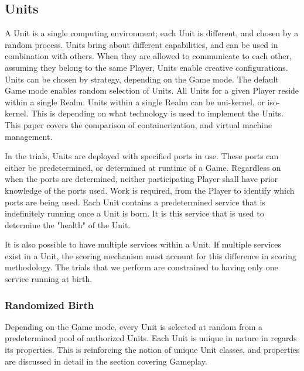 \documentclass[10pt, titlepage, twocolumn]{article}
\newcommand{\ii}{\indent\indent}
\begin{document}
\subsection{Units}
\ii
A Unit is a single computing environment; each Unit is different, and chosen by a random process. Units bring about different capabilities, and can be used in combination with others. When they are allowed to communicate to each other, assuming they belong to the same Player, Units enable creative configurations. Units can be chosen by strategy, depending on the Game mode. The default Game mode enables random selection of Units. All Units for a given Player reside within a single Realm. Units within a single Realm can be uni-kernel, or iso-kernel. This is depending on what technology is used to implement the Units. This paper covers the comparison of containerization, and virtual machine management.

In the trials, Units are deployed with specified ports in use. These ports can either be predetermined, or determined at runtime of a Game. Regardless on when the ports are determined, neither participating Player shall have prior knowledge of the ports used. Work is required, from the Player to identify which ports are being used. Each Unit contains a predetermined service that is indefinitely running once a Unit is born. It is this service that is used to determine the "health" of the Unit.

It is also possible to have multiple services within a Unit. If multiple services exist in a Unit, the scoring mechanism must account for this difference in scoring methodology.  The trials that we perform are constrained to having only one service running at birth.



\subsubsection{Randomized Birth}
\ii
Depending on the Game mode, every Unit is selected at random from a predetermined pool of authorized Units. Each Unit is unique in nature in regards its properties. This is reinforcing the notion of unique Unit classes, and properties are discussed in detail in the section covering Gameplay.
\end{document}
